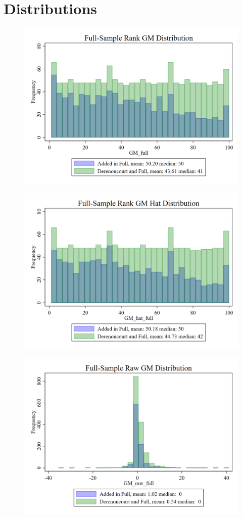 \documentclass{article}
\begin{document}
\section{Distributions}
\begin{figure}
	\centering
	\includegraphics[width=.8\textwidth]{figures/distributions/GM_full.png}
\end{figure}
\clearpage
\begin{figure}
	\centering
	\includegraphics[width=.8\textwidth]{figures/distributions/GM_hat_full.png}
\end{figure}
\clearpage
\begin{figure}
	\centering
	\includegraphics[width=.8\textwidth]{figures/distributions/GM_raw_full.png}
\end{figure}
\end{document}
